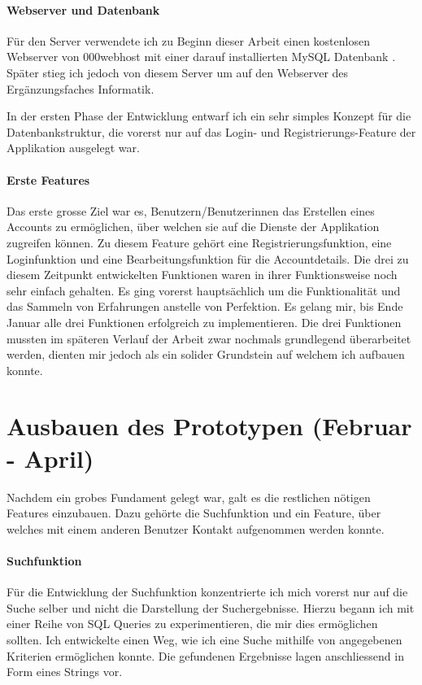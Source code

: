 \documentclass[../main.tex]{subfiles}
\begin{document}
	\paragraph{Webserver und Datenbank}
	Für den Server verwendete ich zu Beginn dieser Arbeit einen kostenlosen Webserver von 000webhost mit einer darauf installierten MySQL Datenbank \cite{webhost}. Später stieg ich jedoch von diesem Server um auf den Webserver des Ergänzungsfaches Informatik.
	
	In der ersten Phase der Entwicklung entwarf ich ein sehr simples Konzept für die Datenbankstruktur, die vorerst nur auf das Login- und Registrierungs-Feature der Applikation ausgelegt war.
	
	\paragraph{Erste Features}
	Das erste grosse Ziel war es, Benutzern/Benutzerinnen das Erstellen eines Accounts zu ermöglichen, über welchen sie auf die Dienste der Applikation zugreifen können. Zu diesem Feature gehört eine Registrierungsfunktion, eine Loginfunktion und eine Bearbeitungsfunktion für die Accountdetails. Die drei zu diesem Zeitpunkt entwickelten Funktionen waren in ihrer Funktionsweise noch sehr einfach gehalten. Es ging vorerst hauptsächlich um die Funktionalität und das Sammeln von Erfahrungen anstelle von Perfektion. Es gelang mir, bis Ende Januar alle drei Funktionen erfolgreich zu implementieren. Die drei Funktionen mussten im späteren Verlauf der Arbeit zwar nochmals grundlegend überarbeitet werden, dienten mir jedoch als ein solider Grundstein auf welchem ich aufbauen konnte.
	
	\section{Ausbauen des Prototypen (Februar - April)}
	Nachdem ein grobes Fundament gelegt war, galt es die restlichen nötigen Features einzubauen. Dazu gehörte die Suchfunktion und ein Feature, über welches mit einem anderen Benutzer Kontakt aufgenommen werden konnte.
	\paragraph{Suchfunktion}
	Für die Entwicklung der Suchfunktion konzentrierte ich mich vorerst nur auf die Suche selber und nicht die Darstellung der Suchergebnisse. Hierzu begann ich mit einer Reihe von SQL Queries zu experimentieren, die mir dies ermöglichen sollten. Ich entwickelte einen Weg, wie ich eine Suche mithilfe von angegebenen Kriterien ermöglichen konnte. Die gefundenen Ergebnisse lagen anschliessend in Form eines Strings vor. 
	
\end{document}
